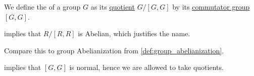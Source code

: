 \begin{definition}\label{def:ring_abelianization}\mimprovised
   We define the  of a group \( G \) as its \hyperref[def:group/quotient]{quotient} \( G / [G, G] \) by its \hyperref[def:group_commutator]{commutator group} \( [G, G] \).
\end{definition}
\begin{comments}
  \item {} implies that \( R / [R, R] \) is Abelian, which justifies the name.
  \item Compare this to group Abelianization from \cref{def:group_abelianization}.
\end{comments}
\begin{defproof}
   implies that \( [G, G] \) is normal, hence we are allowed to take quotients.
\end{defproof}

